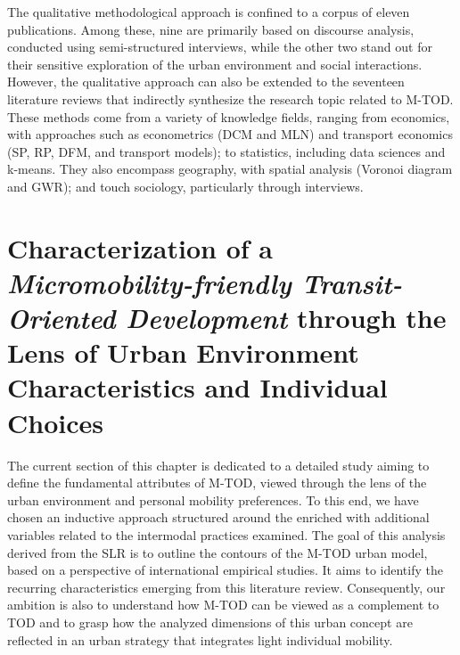 \begin{refsegment}
The qualitative methodological approach is confined to a corpus of eleven publications. Among these, nine are primarily based on discourse analysis, conducted using semi-structured interviews, while the other two stand out for their sensitive exploration of the urban environment and social interactions. However, the qualitative approach can also be extended to the seventeen literature reviews that indirectly synthesize the research topic related to \acrshort{M-TOD}. These methods come from a variety of knowledge fields, ranging from economics, with approaches such as econometrics (DCM and MLN) and transport economics (SP, RP, DFM, and transport models); to statistics, including data sciences and k-means. They also encompass geography, with spatial analysis (Voronoi diagram and GWR); and touch sociology, particularly through interviews.%

\newpage
{} %
\section{Characterization of a \textsl{Micromobility-friendly Transit-Oriented Development} through the Lens of Urban Environment Characteristics and Individual Choices
    \label{chap2:caracterisation-btod-environnement-urbain-choix-individuels}
    }

The current section of this chapter is dedicated to a detailed study aiming to define the fundamental attributes of \acrshort{M-TOD}, viewed through the lens of the urban environment and personal mobility preferences. To this end, we have chosen an inductive approach structured around the  enriched with additional variables related to the intermodal practices examined. The goal of this analysis derived from the \acrshort{SLR} is to outline the contours of the \acrshort{M-TOD} urban model, based on a perspective of international empirical studies. It aims to identify the recurring characteristics emerging from this literature review. Consequently, our ambition is also to understand how \acrshort{M-TOD} can be viewed as a complement to \acrshort{TOD} and to grasp how the analyzed dimensions of this urban concept are reflected in an urban strategy that integrates light individual mobility.%


\end{refsegment}
